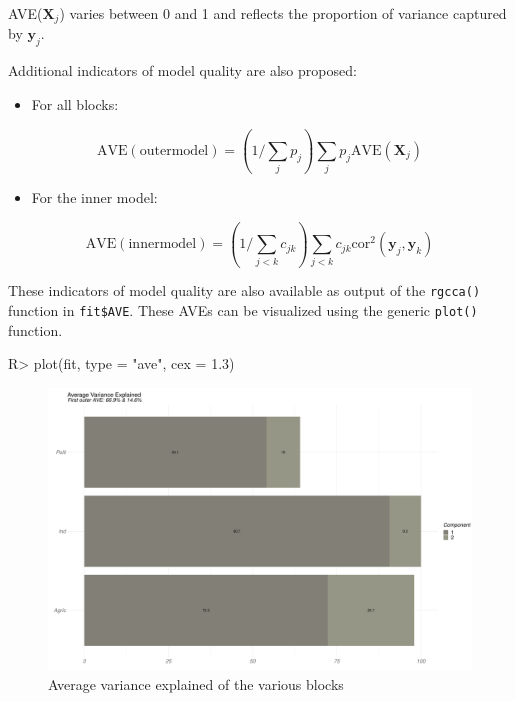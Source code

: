 \documentclass[
]{jss}
\providecommand{\tightlist}{%
  \setlength{\itemsep}{0pt}\setlength{\parskip}{0pt}}
\begin{document}
AVE(\(\mathbf{X}_j\)) varies between 0 and 1 and reflects the proportion
of variance captured by \(\mathbf{y}_j\).

Additional indicators of model quality are also proposed:

\begin{itemize}
\tightlist
\item
  For all blocks:
\end{itemize}

\begin{equation}
\displaystyle \mathrm{AVE(outer model)} = \left( 1/\sum_j p_j \right) \sum_j p_j \mathrm{AVE}(\ensuremath{\mathbf{X}}_j)
\end{equation}

\begin{itemize}
\tightlist
\item
  For the inner model:
\end{itemize}

\begin{equation}
\displaystyle \mathrm{AVE(inner model)} = \left( 1/\sum_{j<k} c_{jk} \right) \sum_{j<k} c_{jk} \mathrm{cor}^2(\ensuremath{\mathbf{y}}_j , \ensuremath{\mathbf{y}}_k)
\end{equation}

These indicators of model quality are also available as output of the
\texttt{rgcca()} function in \texttt{fit\$AVE}. These AVEs can be
visualized using the generic \texttt{plot()} function.

\footnotesize

\begin{CodeChunk}
\begin{CodeInput}
R> plot(fit, type = "ave", cex = 1.3)
\end{CodeInput}
\begin{figure}

{\centering \includegraphics{RGCCA_files/figure-latex/unnamed-chunk-12-1} 

}

\caption[Average variance explained of the various blocks]{Average variance explained of the various blocks}\label{fig:unnamed-chunk-12}
\end{figure}
\end{CodeChunk}
\end{document}

